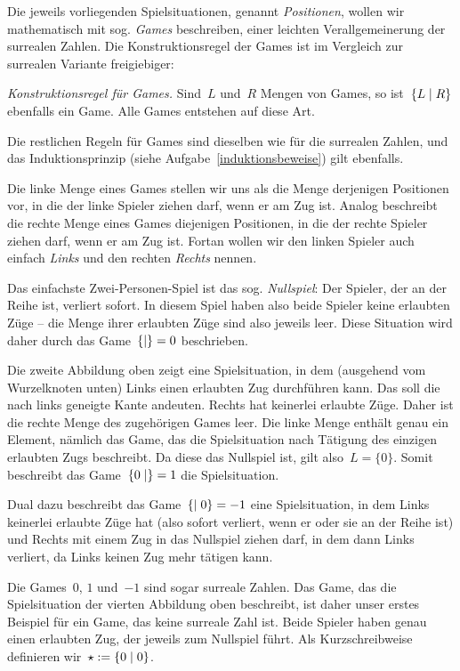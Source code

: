 \documentclass{zirkelblatt}
\begin{document}
Die jeweils vorliegenden Spielsituationen, genannt \emph{Positionen}, wollen wir
mathematisch mit sog. \emph{Games} beschreiben, einer leichten
Verallgemeinerung der surrealen Zahlen. Die Konstruktionsregel der Games ist
im Vergleich zur surrealen Variante freigiebiger:

\emph{Konstruktionsregel für Games.}
Sind~$L$ und~$R$ Mengen von Games,
so ist~$\{ L \mathrel{|} R \}$ ebenfalls ein Game. Alle Games entstehen auf diese Art.

Die restlichen Regeln für Games sind dieselben wie für die surrealen Zahlen,
und das Induktionsprinzip (siehe Aufgabe~\ref{induktionsbeweise}) gilt
ebenfalls.

Die linke Menge eines Games stellen wir uns als die Menge derjenigen Positionen
vor, in die der linke Spieler ziehen darf, wenn er am Zug ist. Analog
beschreibt die rechte Menge eines Games diejenigen Positionen, in die der rechte
Spieler ziehen darf, wenn er am Zug ist. Fortan wollen wir den linken Spieler
auch einfach \emph{Links} und den rechten \emph{Rechts} nennen.

Das einfachste Zwei-Personen-Spiel ist das sog. \emph{Nullspiel}: Der Spieler,
der an der Reihe ist, verliert sofort. In diesem Spiel haben also beide Spieler
keine erlaubten Züge -- die Menge ihrer erlaubten Züge sind also jeweils leer.
Diese Situation wird daher durch das Game~$\{  \mathrel{|}  \} = 0$ beschrieben.

Die zweite Abbildung oben zeigt eine Spielsituation, in dem (ausgehend vom Wurzelknoten
unten) Links einen erlaubten Zug durchführen kann. Das soll die
nach links geneigte Kante andeuten. Rechts hat keinerlei erlaubte
Züge. Daher ist die rechte Menge des zugehörigen Games leer. Die linke Menge
enthält genau ein Element, nämlich das Game, das die Spielsituation nach
Tätigung des einzigen erlaubten Zugs beschreibt. Da diese das Nullspiel ist,
gilt also~$L = \{ 0 \}$. Somit beschreibt das Game~$\{ 0 \mathrel{|}  \} = 1$ die
Spielsituation.

Dual dazu beschreibt das Game~$\{  \mathrel{|} 0 \} = -1$ eine Spielsituation, in dem
Links keinerlei erlaubte Züge hat (also sofort verliert, wenn er oder sie an der
Reihe ist) und Rechts mit einem Zug in das Nullspiel ziehen darf, in dem
dann Links verliert, da Links keinen Zug mehr tätigen kann.

Die Games~$0$, $1$ und~$-1$ sind sogar surreale Zahlen. Das Game, das die
Spielsituation der vierten Abbildung oben beschreibt, ist daher unser erstes
Beispiel für ein Game, das keine surreale Zahl ist. Beide Spieler haben genau
einen erlaubten Zug, der jeweils zum Nullspiel führt. Als Kurzschreibweise
definieren wir~$\star := \{ 0 \mathrel{|} 0 \}$.
\end{document}
